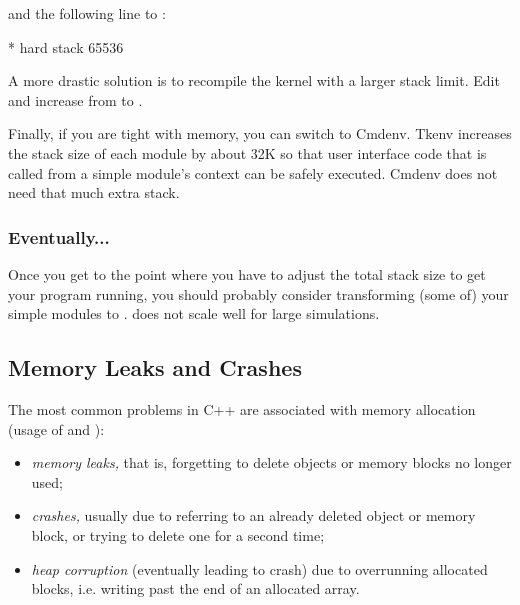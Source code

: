 and the following line to :

\begin{filelisting}
*    hard    stack    65536
\end{filelisting}

\begin{sloppypar}
A more drastic solution is to recompile the kernel with a larger stack
limit. Edit  and increase
 from  to .
\end{sloppypar}

Finally, if you are tight with memory, you can switch to Cmdenv. Tkenv
increases the stack size of each module by about 32K so that user interface code that is called from a
simple module's context can be safely executed.
Cmdenv does not need that much extra stack.


\subsubsection{Eventually...}

Once you get to the point where you have to adjust the total stack size to
get your program running, you should probably consider transforming (some
of) your  simple modules to .
 does not scale well for large simulations.



\subsection{Memory Leaks and Crashes}

The most common problems in C++ are associated with memory allocation
(usage of  and ):

\begin{itemize}
   \item{\textit{memory leaks,} that is, forgetting to delete objects
     or memory blocks no longer used;}
   \item{\textit{crashes,} usually due to referring to an already deleted
     object or memory block, or trying to delete one for a second time;}
   \item{\textit{heap corruption} (eventually leading to crash) due to
     overrunning allocated blocks, i.e. writing past the end of an allocated
     array.}
\end{itemize}

